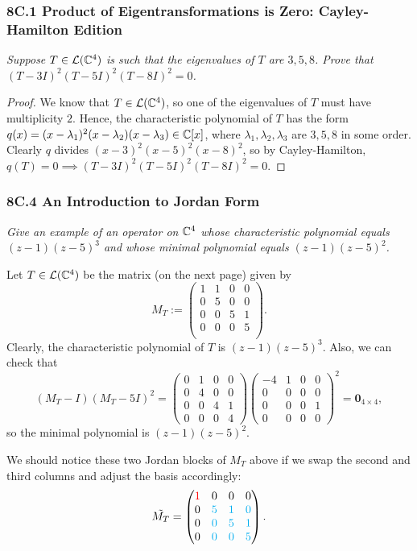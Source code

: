 \documentclass{article}
\newcommand{\red}{\textcolor{red}}
\newcommand{\bl}{\textcolor{cyan}}
\begin{document}
\subsubsection*{8C.1 Product of Eigentransformations is Zero: Cayley-Hamilton Edition}
\textit{Suppose $T\in\mathcal L(\mathbb C^4)$ is such that the eigenvalues of $T$ are $3, 5, 8$. Prove that $(T-3I)^2(T-5I)^2(T-8I)^2 = 0$.}
\begin{proof}
We know that $T\in\mathcal L(\mathbb C^4)$, so one of the eigenvalues of $T$ must have multiplicity $2$. Hence, the characteristic polynomial of $T$ has the form $q(x) = (x-\lambda_1)^2(x - \lambda_2)(x-\lambda_3)\in\mathbb C[x]$, where $\lambda_1,\lambda_2, \lambda_3$ are $3, 5, 8$ in some order. Clearly $q$ divides $(x-3)^2(x-5)^2(x-8)^2$, so by Cayley-Hamilton, $q(T) = 0 \implies (T-3I)^2(T-5I)^2(T-8I)^2 = 0$.
\end{proof}
\subsubsection*{8C.4 An Introduction to Jordan Form}
\textit{Give an example of an operator on $\mathbb C^4$ whose characteristic polynomial equals $(z-1)(z-5)^3$ and whose minimal polynomial equals $(z-1)(z-5)^2$.}
\begin{solution}
Let $T\in\mathcal L(\mathbb C^4)$ be the matrix (on the next page) given by \newpage
$$M_T := \begin{pmatrix}
1 & 1 & 0 & 0 \\
0 & 5 & 0 & 0 \\
0 & 0 & 5 & 1 \\
0 & 0 & 0 & 5 \\
\end{pmatrix}.$$
Clearly, the characteristic polynomial of $T$ is $(z-1)(z-5)^3$. Also, we can check that
$$(M_T-I)(M_T-5I)^2 = \begin{pmatrix}
0 & 1 & 0 & 0 \\
0 & 4 & 0 & 0 \\
0 & 0 & 4 & 1 \\
0 & 0 & 0 & 4
\end{pmatrix}\begin{pmatrix}
-4 & 1 & 0 & 0 \\
0 & 0 & 0 & 0 \\
0 & 0 & 0 & 1 \\
0 & 0 & 0 & 0
\end{pmatrix}^2 = \mathbf{0}_{4\times 4},$$
so the minimal polynomial is $(z-1)(z-5)^2$.
\end{solution}
We should notice these two Jordan blocks of $M_T$ above if we swap the second and third columns and adjust the basis accordingly:
$$\tilde{M_T} = \begin{pmatrix}
\red 1 & 0 & 0 & 0 \\
0 & \bl 5 & \bl1 & \bl0 \\
0 & \bl0 & \bl5 & \bl1 \\
0 & \bl0 & \bl0 & \bl5 \\
\end{pmatrix}.$$
\end{document}
